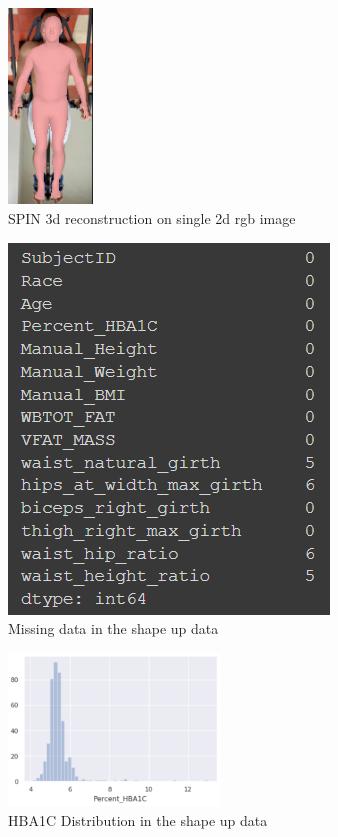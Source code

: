 \begin{figure}[h]
        \caption{SPIN 3d reconstruction on single 2d rgb image}
        \centering
        \includegraphics[width=0.2\textwidth]{images/spin.png}
\end{figure}

\begin{figure}[!htb]
        \caption{Missing data in the shape up data}
        \centering
        \includegraphics[]{images/missing_data.png}
\end{figure}

\begin{figure}[!htb]
        \caption{HBA1C Distribution in the shape up data}
        \centering
        \includegraphics[width=0.5\textwidth]{images/hba1c.png}
\end{figure}

